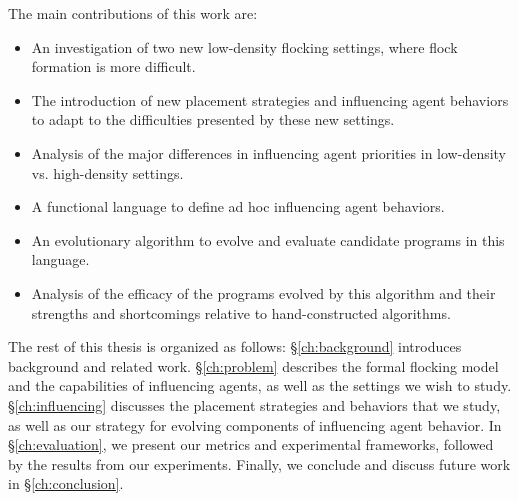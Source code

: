 The main contributions of this work are:
\begin{itemize}
    \item An investigation of two new low-density flocking settings, where
    flock formation is more difficult.
    \item The introduction of new placement strategies and influencing agent
    behaviors to adapt to the difficulties presented by these new settings.
    \item Analysis of the major differences in influencing agent priorities in
    low-density vs. high-density settings.
    \item A functional language to define ad hoc influencing agent behaviors.
    \item An evolutionary algorithm to evolve and evaluate candidate programs in
    this language.
    \item Analysis of the efficacy of the programs evolved by this algorithm and
    their strengths and shortcomings relative to hand-constructed algorithms.
\end{itemize}

The rest of this thesis is organized as follows: \S\ref{ch:background}
introduces background and related work.
\S\ref{ch:problem} describes the formal flocking model and the capabilities of
influencing agents, as well as the settings we wish to study.
\S\ref{ch:influencing} discusses the placement strategies and behaviors that we
study, as well as our strategy for evolving components of influencing agent
behavior.
In \S\ref{ch:evaluation}, we present our metrics and experimental frameworks,
followed by the results from our experiments.
Finally, we conclude and discuss future work in \S\ref{ch:conclusion}.

